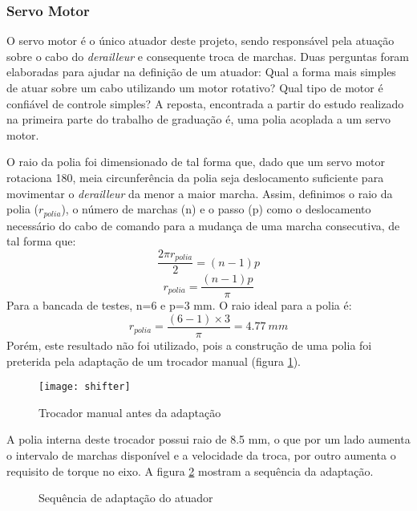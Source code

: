 \documentclass[a4paper,11pt]{article}
\begin{document}
\subsubsection{Servo Motor}
\label{sec:servo}
O servo motor é o único atuador deste projeto, sendo responsável pela atuação
sobre o cabo do \textit{derailleur} e consequente troca de marchas. Duas
perguntas foram elaboradas para ajudar na definição de um atuador: Qual a
forma mais simples de atuar sobre um cabo utilizando um motor rotativo? Qual
tipo de motor é confiável de controle simples? A reposta, encontrada a partir
do estudo realizado na primeira parte do trabalho de graduação é, uma polia
acoplada a um servo motor.

O raio da polia foi dimensionado de tal forma que, dado que um servo motor
rotaciona 180\textdegree, meia circunferência da polia seja deslocamento
suficiente para movimentar o \textit{derailleur} da menor a maior marcha.
Assim, definimos o raio da polia ($r_{polia}$), o número de marchas (n) e o
passo (p) como o deslocamento necessário do cabo de comando para a mudança de
uma marcha consecutiva, de tal forma que:
\begin{equation*}
  \frac{\displaystyle 2\pi r_{polia} }{\displaystyle 2} = (n-1)p
\end{equation*}
\begin{equation}
  r_{polia} = \frac{\displaystyle (n-1)p}{\displaystyle \pi}
\end{equation}
Para a bancada de testes, n=6 e p=3 mm. O raio ideal para a polia é:
\begin{equation}
 r_{polia} = \frac{\displaystyle (6-1)\times 3}{\displaystyle \pi} = 4.77~mm
\end{equation}
Porém, este resultado não foi utilizado, pois a construção de uma polia foi
preterida pela adaptação de um trocador manual (figura \ref{fig:shifter}).
\begin{figure}[h!]
\begin{center}
 \texttt{[image: shifter]}
\end{center}
  \caption{Trocador manual antes da adaptação}
  \label{fig:shifter}
\end{figure}

A polia interna deste trocador possui raio de 8.5 mm, o que por um lado aumenta
o intervalo de marchas disponível e a velocidade da troca, por outro aumenta o
requisito de torque no eixo. A figura \ref{fig:atuador} mostram a sequência da
adaptação.
\begin{figure}[h!]
 \centering
   \hfil
   \hfil
  \caption{Sequência de adaptação do atuador}
  \label{fig:atuador}
\end{figure}
\end{document}
